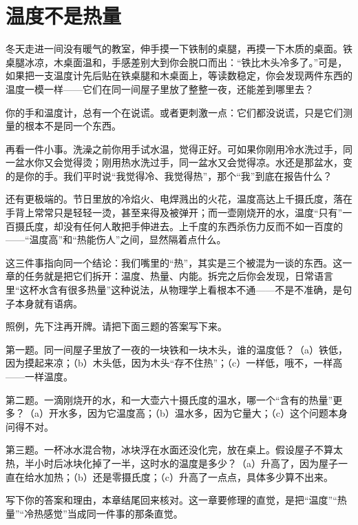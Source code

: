\chapter{温度不是热量}


\begin{mainline}
冬天走进一间没有暖气的教室，伸手摸一下铁制的桌腿，再摸一下木质的桌面。铁桌腿冰凉，木桌面温和，手感差别大到你会脱口而出：“铁比木头冷多了。”可是，如果把一支温度计先后贴在铁桌腿和木桌面上，等读数稳定，你会发现两件东西的温度一模一样——它们在同一间屋子里放了整整一夜，还能差到哪里去？

你的手和温度计，总有一个在说谎。或者更刺激一点：它们都没说谎，只是它们测量的根本不是同一个东西。

再看一件小事。洗澡之前你用手试水温，觉得正好。可如果你刚用冷水洗过手，同一盆水你又会觉得烫；刚用热水洗过手，同一盆水又会觉得凉。水还是那盆水，变的是你的手。我们平时说“我觉得冷、我觉得热”，那个“我”到底在报告什么？

还有更极端的。节日里放的冷焰火、电焊溅出的火花，温度高达上千摄氏度，落在手背上常常只是轻轻一烫，甚至来得及被弹开；而一壶刚烧开的水，温度“只有”一百摄氏度，却没有任何人敢把手伸进去。上千度的东西杀伤力反而不如一百度的——“温度高”和“热能伤人”之间，显然隔着点什么。

这三件事指向同一个结论：我们嘴里的“热”，其实是三个被混为一谈的东西。这一章的任务就是把它们拆开：温度、热量、内能。拆完之后你会发现，日常语言里“这杯水含有很多热量”这种说法，从物理学上看根本不通——不是不准确，是句子本身就有语病。
\end{mainline}


照例，先下注再开牌。请把下面三题的答案写下来。

第一题。同一间屋子里放了一夜的一块铁和一块木头，谁的温度低？（a）铁低，因为摸起来凉；（b）木头低，因为木头“存不住热”；（c）一样低，哦不，一样高——一样温度。

第二题。一滴刚烧开的水，和一大壶六十摄氏度的温水，哪一个“含有的热量”更多？（a）开水多，因为它温度高；（b）温水多，因为它量大；（c）这个问题本身问得不对。

第三题。一杯冰水混合物，冰块浮在水面还没化完，放在桌上。假设屋子不算太热，半小时后冰块化掉了一半，这时水的温度是多少？（a）升高了，因为屋子一直在给水加热；（b）还是零摄氏度；（c）升高了一点点，具体多少算不出来。

写下你的答案和理由，本章结尾回来核对。这一章要修理的直觉，是把“温度”“热量”“冷热感觉”当成同一件事的那条直觉。

